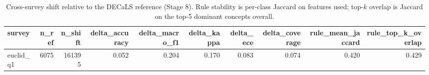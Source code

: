 \begin{table}[t]
\centering
\small
\begin{tabular}{lrrrrrrrrr}
\toprule
survey & n\_ref & n\_shift & delta\_accuracy & delta\_macro\_f1 & delta\_kappa & delta\_ece & delta\_coverage & rule\_mean\_jaccard & rule\_top\_k\_overlap \\
\midrule
euclid\_q1 & 6075 & 161395 & 0.052 & 0.204 & 0.170 & 0.083 & 0.074 & 0.420 & 0.429 \\
\bottomrule
\end{tabular}
\caption{Cross-survey shift relative to the DECaLS reference (Stage 8). Rule stability is per-class Jaccard on features used; top-$k$ overlap is Jaccard on the top-5 dominant concepts overall.}
\label{tab:robustness}
\end{table}
